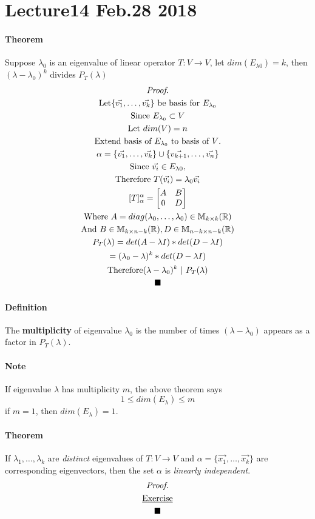 \documentclass[11pt]{article}
\newcommand{\trans}[3]{{#1}: {#2} \to {#3}}
\newcommand{\M}[2]{\mathbb{M}_{{#1} \times {#2}}(\mathbb{R})}
\newcommand{\tmat}[3]{[{#1}]_{{#2}}^{{#3}}}
\newcommand{\vset}[3]{\{\vec{{#1}_{#2}}, \dots, \vec{{#1}_{#3}}\}}
\newcommand{\definition}[0]{\paragraph{Definition}}
\newcommand{\theorem}[0]{\paragraph{Theorem}}
\newcommand{\tx}[1]{\text{{#1}}}
\begin{document}
	\section{Lecture14 Feb.28 2018}
	\theorem Suppose $\lambda_0$ is an eigenvalue of linear operator $\trans{T}{V}{V}$, let $dim(E_{\lambda0})=k$, then $(\lambda - \lambda_0)^k$ divides $P_T(\lambda)$
	\begin{multline*}
		\emph{Proof.} \\
		\text{Let} \vset{v}{1}{k} \text{ be basis for } E_{\lambda_0}\\
		\tx{Since } E_{\lambda_0} \subset V \\
		\text{Let } dim(V) = n \\
		\text{Extend basis of $E_{\lambda_0}$ to basis of $V$.} \\
		\alpha = \vset{v}{1}{k} \cup \vset{v}{k+1}{n} \\
		\text{Since } \vec{v_i} \in E_{\lambda0}, \\
		\text{Therefore } T(\vec{v_i}) = \lambda_0 \vec{v_i} \\
		\tmat{T}{\alpha}{\alpha} = \begin{bmatrix}
			A & B \\
			0 & D \\
		\end{bmatrix} \\
		\text{Where } A = diag(\lambda_0, \dots, \lambda_0) \in \M{k}{k} \\
		\text{And } B \in \M{k}{n-k}, D \in \M{n-k}{n-k} \\
		P_T(\lambda) = det(A - \lambda I) * det(D - \lambda I) \\
		= (\lambda_0 - \lambda)^k *  det(D - \lambda I) \\
		\text{Therefore} (\lambda - \lambda_0)^k\ \vert \ P_T(\lambda) \\
		\blacksquare
	\end{multline*}
	\definition The \textbf{multiplicity} of eigenvalue $\lambda_0$ is the number of times $(\lambda - \lambda_0)$ appears as a factor in $P_T(\lambda)$.
	\paragraph{Note} If eigenvalue $\lambda$ has multiplicity $m$, the above theorem says
	\[
		1 \leq dim(E_{\lambda}) \leq m
	\]
	if $m=1$, then $ dim(E_{\lambda}) = 1$.
	\theorem If $\lambda_1, \dots, \lambda_k$ are \emph{distinct} eigenvalues of $\trans{T}{V}{V}$ and $\alpha = \vset{x}{1}{k}$ are corresponding eigenvectors, then the set $\alpha$ is \emph{linearly independent}.
	\begin{multline*}
		\emph{Proof.} \\
		\underbar{Exercise} \\
		\blacksquare
	\end{multline*}
\end{document}
